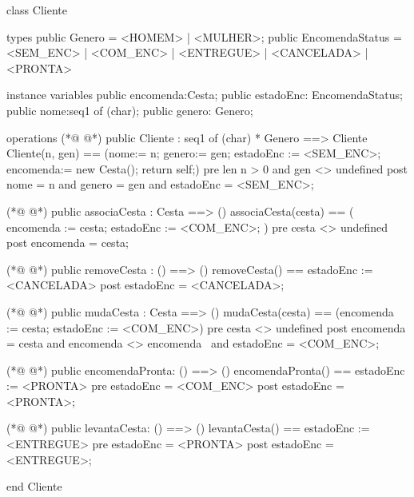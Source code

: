 \begin{vdmpp}[breaklines=true]
class Cliente

types 
 public Genero = <HOMEM> | <MULHER>;
 public EncomendaStatus = <SEM_ENC> | <COM_ENC> | <ENTREGUE> | <CANCELADA> | <PRONTA>
 
instance variables
  public encomenda:Cesta;
  public estadoEnc: EncomendaStatus;
  public nome:seq1 of (char);
  public genero: Genero;

operations
(*@
\label{Cliente:14}
@*)
  public  Cliente : seq1 of (char) * Genero ==> Cliente
  Cliente(n, gen) == (nome:= n; genero:= gen; estadoEnc := <SEM_ENC>; encomenda:= new Cesta(); return self;)
  pre len n > 0 and gen <> undefined
  post nome = n and genero = gen and estadoEnc = <SEM_ENC>;
  
(*@
\label{associaCesta:19}
@*)
  public  associaCesta : Cesta ==> ()
  associaCesta(cesta) ==
    ( 
     encomenda := cesta; 
     estadoEnc := <COM_ENC>;
    )
  pre cesta <> undefined
  post encomenda = cesta;

(*@
\label{removeCesta:28}
@*)
  public  removeCesta : ()  ==> ()
  removeCesta() == estadoEnc := <CANCELADA>
  post estadoEnc = <CANCELADA>;
 
(*@
\label{mudaCesta:32}
@*)
  public  mudaCesta : Cesta ==> ()
  mudaCesta(cesta) ==
    (encomenda := cesta; estadoEnc := <COM_ENC>)
  pre cesta <> undefined
  post encomenda = cesta and encomenda <> encomenda~ and estadoEnc = <COM_ENC>;

(*@
\label{encomendaPronta:38}
@*)
 public encomendaPronta: () ==> () 
 encomendaPronta() == estadoEnc := <PRONTA>
 pre estadoEnc = <COM_ENC>
 post estadoEnc = <PRONTA>;

(*@
\label{levantaCesta:43}
@*)
 public levantaCesta: () ==> () 
 levantaCesta() == estadoEnc := <ENTREGUE>
 pre estadoEnc = <PRONTA> 
 post estadoEnc = <ENTREGUE>;
  
end Cliente
\end{vdmpp}
